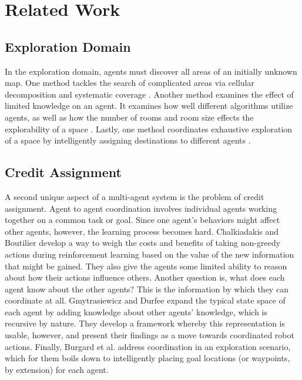 \documentclass[letterpaper, 10 pt, conference]{ieeeconf}  %
\begin{document}
\section{Related Work}
\subsection{Exploration Domain}
In the exploration domain, agents must discover all areas of an
initially unknown map. One method tackles the search of complicated
areas via cellular decomposition and systematic coverage \cite{choset2001coverage}. Another
method examines the effect of limited knowledge on an agent. It
examines how well different algorithms utilize agents, as well as how
the number of rooms and room size effects the explorability of a space
\cite{ferranti2007brick}. Lastly, one method coordinates exhaustive exploration of a space
by intelligently assigning destinations to different agents \cite{burgard2005coordinated}.

\subsection{Credit Assignment}
A second unique aspect of a multi-agent system is the problem of
credit assignment. Agent to agent coordination involves individual
agents working together on a common task or goal. Since one agent’s
behaviors might affect other agents, however, the learning process
becomes hard. Chalkiadakis and Boutilier \cite{chalkiadakis2003coordination} develop a way to weigh
the costs and benefits of taking non-greedy actions during
reinforcement learning based on the value of the new information that
might be gained. They also give the agents some limited ability to
reason about how their actions influence others. Another question is,
what does each agent know about the other agents? This is the
information by which they can coordinate at all. Gmytrasiewicz and
Durfee \cite{gmytrasiewicz2000rational} expand the typical state space of each agent by adding
knowledge about other agents’ knowledge, which is recursive by
nature. They develop a framework whereby this representation is
usable, however, and present their findings as a move towards
coordinated robot actions. Finally, Burgard et al. \cite{burgard2005coordinated} address
coordination in an exploration scenario, which for them boils down to
intelligently placing goal locations (or waypoints, by extension) for
each agent.
\end{document}
